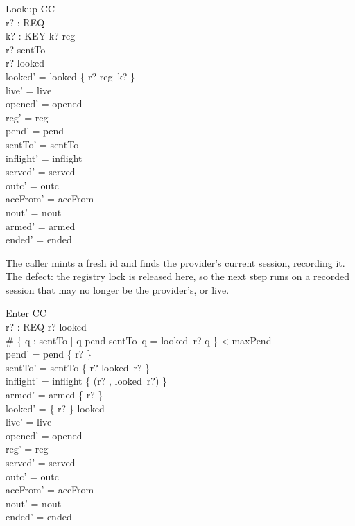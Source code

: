\documentclass[a4paper,10pt,fleqn]{article}
\begin{document}
\begin{schema}{Lookup}
  \Delta CC \\
  r? : REQ \\
  k? : KEY
\where
  k? \in \dom reg \\
  r? \notin \dom sentTo \\
  r? \notin \dom looked \\
  looked' = looked \cup \{ r? \mapsto reg~k? \} \\
  live' = live \\
  opened' = opened \\
  reg' = reg \\
  pend' = pend \\
  sentTo' = sentTo \\
  inflight' = inflight \\
  served' = served \\
  outc' = outc \\
  accFrom' = accFrom \\
  nout' = nout \\
  armed' = armed \\
  ended' = ended
\end{schema}

The caller mints a fresh id and finds the provider's current session,
recording it.  The defect: the registry lock is released here, so the next
step runs on a recorded session that may no longer be the provider's, or live.

\begin{schema}{Enter}
  \Delta CC \\
  r? : REQ
\where
  r? \in \dom looked \\
  \# \{ q : \dom sentTo | q \in pend \land sentTo~q = looked~r? \spot q \}
    < maxPend \\
  pend' = pend \cup \{ r? \} \\
  sentTo' = sentTo \cup \{ r? \mapsto looked~r? \} \\
  inflight' = inflight \cup \{ (r? , looked~r?) \} \\
  armed' = armed \cup \{ r? \} \\
  looked' = \{ r? \} \ndres looked \\
  live' = live \\
  opened' = opened \\
  reg' = reg \\
  served' = served \\
  outc' = outc \\
  accFrom' = accFrom \\
  nout' = nout \\
  ended' = ended
\end{schema}
\end{document}
